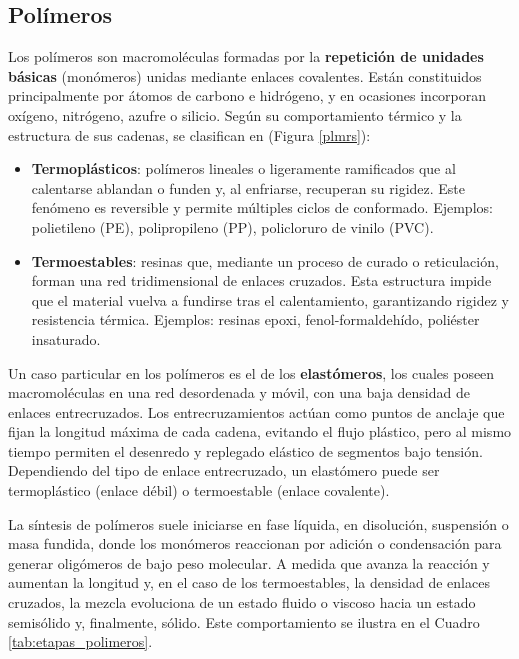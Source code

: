 \subsection{Polímeros}

Los polímeros son macromoléculas formadas por la \textbf{repetición de unidades básicas} (monómeros) unidas mediante enlaces covalentes. Están constituidos principalmente por átomos de carbono e hidrógeno, y en ocasiones incorporan oxígeno, nitrógeno, azufre o silicio. Según su comportamiento térmico y la estructura de sus cadenas, se clasifican en (Figura \ref{plmrs}):

\begin{itemize}
  \item \textbf{Termoplásticos}: polímeros lineales o ligeramente ramificados que al calentarse ablandan o funden y, al enfriarse, recuperan su rigidez. Este fenómeno es reversible y permite múltiples ciclos de conformado. Ejemplos: polietileno (PE), polipropileno (PP), policloruro de vinilo (PVC).
  \item \textbf{Termoestables}: resinas que, mediante un proceso de curado o reticulación, forman una red tridimensional de enlaces cruzados. Esta estructura impide que el material vuelva a fundirse tras el calentamiento, garantizando rigidez y resistencia térmica. Ejemplos: resinas epoxi, fenol-formaldehído, poliéster insaturado.
\end{itemize}

Un caso particular en los polímeros es el de los \textbf{elastómeros}, los cuales poseen macromoléculas en una red desordenada y móvil, con una baja densidad de enlaces entrecruzados. Los entrecruzamientos actúan como puntos de anclaje que fijan la longitud máxima de cada cadena, evitando el flujo plástico, pero al mismo tiempo permiten el desenredo y replegado elástico de segmentos bajo tensión. Dependiendo del tipo de enlace entrecruzado, un elastómero puede ser termoplástico (enlace débil) o termoestable (enlace covalente).

La síntesis de polímeros suele iniciarse en fase líquida, en disolución, suspensión o masa fundida, donde los monómeros reaccionan por adición o condensación para generar oligómeros de bajo peso molecular. A medida que avanza la reacción y aumentan la longitud y, en el caso de los termoestables, la densidad de enlaces cruzados, la mezcla evoluciona de un estado fluido o viscoso hacia un estado semisólido y, finalmente, sólido. Este comportamiento se ilustra en el Cuadro \ref{tab:etapas_polimeros}.

